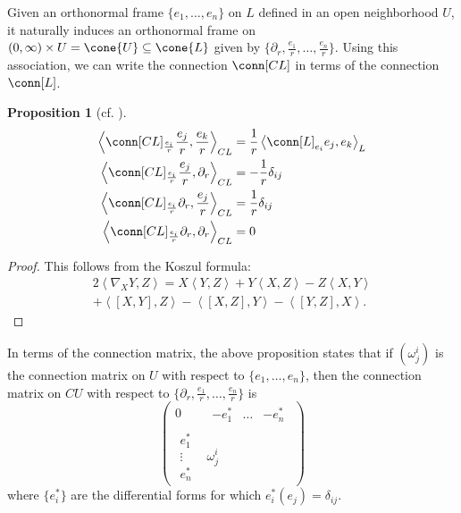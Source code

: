 \documentclass[12pt, reqno]{amsart}
\theoremstyle{plain} %
\newtheorem{proposition}[theorem]{Proposition}
\theoremstyle{definition}
\theoremstyle{remark}
\numberwithin{equation}{section}
\begin{document}
Given an orthonormal frame \(\{e_1,\ldots,e_n\}\) on \(L\) defined in an open neighborhood \(U\), it naturally induces an orthonormal frame on \((0,\infty)\times U=\cone{U}\subseteq \cone{L}\) given by \(\{\partial_r,\frac{e_1}{r},\ldots,\frac{e_n}{r}\}\).
Using this association, we can write the connection \(\conn[CL]\) in terms of the connection \(\conn[L]\).
\begin{proposition}[cf. {\cite[Lemma 2.2]{Chou:1985}}]\label{prop:covariant derivative on cone}
    \begin{align*}
        \left< \conn[CL]_{\frac{e_i}{r}}\frac{e_j}{r},\frac{e_k}{r} \right>_{CL}&=\frac{1}{r}\left< \conn[L]_{e_i}e_j,e_k \right>_{L}\\
        \left< \conn[CL]_{\frac{e_i}{r}}\frac{e_j}{r}, \partial_r \right>_{CL}&=-\frac{1}{r}\delta_{ij}\\
        \left< \conn[CL]_{\frac{e_i}{r}}\partial_r, \frac{e_j}{r} \right>_{CL}&=\frac{1}{r}\delta_{ij}\\
        \left< \conn[CL]_{\frac{e_i}{r}}\partial_r, \partial_r \right>_{CL}&=0
    \end{align*}
\end{proposition}
\begin{proof}
    This follows from the Koszul formula:
    \begin{multline*}
        2\left< \nabla_X Y,Z \right>=X\left< Y,Z \right> + Y\left< X,Z \right> - Z\left< X,Y \right>\\ + \left< [X,Y],Z \right> - \left< [X,Z],Y \right> - \left< [Y,Z],X \right>.
    \end{multline*}
\end{proof}
In terms of the connection matrix, the above proposition states that if \((\omega_j^i)\) is the connection matrix on \(U\) with respect to \(\{e_1,\ldots,e_n\}\), then the connection matrix on \(CU\) with respect to \(\{\partial_r,\frac{e_1}{r},\ldots,\frac{e_n}{r}\}\) is
\begin{equation}\label{eqn:connection matrix of cone}
    \begin{pmatrix}
        0 & \begin{matrix} -e_1^* & \ldots & -e_n^*\end{matrix}\\
        \begin{matrix}
            e_1^*\\
            \vdots\\
            e_n^*
        \end{matrix} & \omega_j^i
    \end{pmatrix}
\end{equation}
where \(\{e_i^*\}\) are the differential forms for which \(e_i^*(e_j)=\delta_{ij}\).
\end{document}
